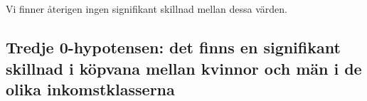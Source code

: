 \documentclass[]{article}
\begin{document}
\newpage

\\\\\\\\
Vi finner återigen ingen signifikant skillnad mellan dessa värden.

\subsection{Tredje 0-hypotensen: det finns en signifikant skillnad i köpvana mellan kvinnor och män i de olika inkomstklasserna}
\end{document}
